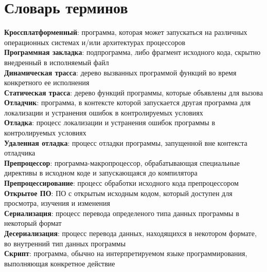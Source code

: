 \chapter*{Словарь терминов}             %

\textbf{Кроссплатформенный}: программа, которая может запускаться на различных операционных системах и/или архитектурах процессоров            \\
\textbf{Программная закладка}: подпрограмма, либо фрагмент исходного кода, скрытно внедренный в исполняемый файл                                 \\
\textbf{Динамическая трасса}: дерево вызванных программой функций во время конкретного ее исполнения                                            \\
\textbf{Статическая трасса}: дерево функций программы, которые объявлены для вызова                                                            \\
\textbf{Отладчик}: программа, в контексте которой запускается другая программа для локализации и устранения ошибок
в контролируемых условиях \\
\textbf{Отладка}: процесс локализации и устранения ошибок программы в контролируемых условиях                                       \\
\textbf{Удаленная отладка}: процесс отладки программы, запущенной вне контекста отладчика                                                     \\
\textbf{Препроцессор}: программа-макропроцессор, обрабатывающая специальные директивы в исходном коде и запускающаяся до компилятора     \\
\textbf{Препроцессирование}: процесс обработки исходного кода препроцессором                                                                   \\
\textbf{Открытое ПО}: ПО с открытым исходным кодом, который доступен для просмотра, изучения и изменения                                \\
\textbf{Сериализация}: процесс перевода определеного типа данных программы в некоторый формат                                            \\
\textbf{Десериализация}: процесс перевода данных, находящихся в некотором формате, во внутренний тип данных программы                      \\
\textbf{Скрипт}: программа, обычно на интерпретируемом языке программирования, выполняющая конкретное действие                     \\
